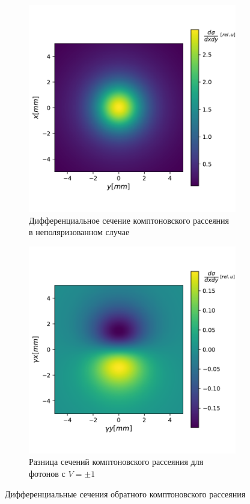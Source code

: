 \documentclass[12pt]{article}
\begin{document}
\begin{figure}[H]
	\begin{subfigure}{.5\textwidth}
		\centering
		\includegraphics[width=0.8\linewidth]{img/compton_dsdo_nopol}
		\caption{Дифференциальное сечение комптоновского рассеяния в неполяризованном случае}
		\label{fig:dsdxdy_nopol}
	\end{subfigure}%
	\begin{subfigure}{.5\textwidth}
		\centering
		\includegraphics[width=0.8\linewidth]{img/compton_dsdo_diff_v1}
		\caption{Разница сечений комптоновского рассеяния для фотонов с $V=\pm1$}
		\label{fig:dsdxdy_dV1}
	\end{subfigure}
	\caption{Дифференциальные сечения обратного комптоновского рассеяния}
	\label{fig:1}
\end{figure}
\end{document}

